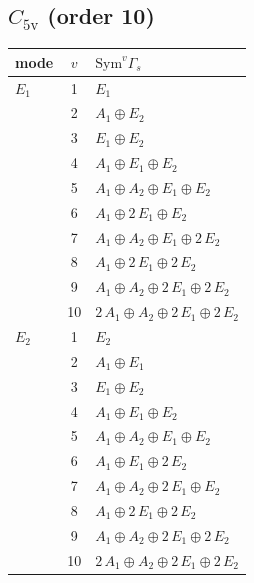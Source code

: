 \documentclass[11pt]{article}
\begin{document}
\subsection*{$C_{5\mathrm{v}}$ \quad (order 10)}
\begin{longtable}{l c p{}}
\hline mode & $v$ & $\mathrm{Sym}^v\Gamma_s$\\ \hline\endhead
$E_{1}$ & 1 & $E_{1}$\\
 & 2 & $A_{1}\oplus E_{2}$\\
 & 3 & $E_{1}\oplus E_{2}$\\
 & 4 & $A_{1}\oplus E_{1}\oplus E_{2}$\\
 & 5 & $A_{1}\oplus A_{2}\oplus E_{1}\oplus E_{2}$\\
 & 6 & $A_{1}\oplus 2\,E_{1}\oplus E_{2}$\\
 & 7 & $A_{1}\oplus A_{2}\oplus E_{1}\oplus 2\,E_{2}$\\
 & 8 & $A_{1}\oplus 2\,E_{1}\oplus 2\,E_{2}$\\
 & 9 & $A_{1}\oplus A_{2}\oplus 2\,E_{1}\oplus 2\,E_{2}$\\
 & 10 & $2\,A_{1}\oplus A_{2}\oplus 2\,E_{1}\oplus 2\,E_{2}$\\
\hline
$E_{2}$ & 1 & $E_{2}$\\
 & 2 & $A_{1}\oplus E_{1}$\\
 & 3 & $E_{1}\oplus E_{2}$\\
 & 4 & $A_{1}\oplus E_{1}\oplus E_{2}$\\
 & 5 & $A_{1}\oplus A_{2}\oplus E_{1}\oplus E_{2}$\\
 & 6 & $A_{1}\oplus E_{1}\oplus 2\,E_{2}$\\
 & 7 & $A_{1}\oplus A_{2}\oplus 2\,E_{1}\oplus E_{2}$\\
 & 8 & $A_{1}\oplus 2\,E_{1}\oplus 2\,E_{2}$\\
 & 9 & $A_{1}\oplus A_{2}\oplus 2\,E_{1}\oplus 2\,E_{2}$\\
 & 10 & $2\,A_{1}\oplus A_{2}\oplus 2\,E_{1}\oplus 2\,E_{2}$\\
\hline
\end{longtable}
\end{document}
